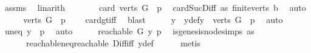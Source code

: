 \begin{isabellebody}
\ assms\ \isamarkupfalse%
\ linarith\isanewline
\ \ \isamarkupfalse%
\ \isamarkupfalse%
\ {\isachardoublequoteopen}{}\ {\isacharless}{\kern0pt}\ card\ {\isacharparenleft}{\kern0pt}{\isacharparenleft}{\kern0pt}verts\ G{\isacharparenright}{\kern0pt}\ {\isacharminus}{\kern0pt}\ {\isacharbraceleft}{\kern0pt}p{\isacharbraceright}{\kern0pt}{\isacharparenright}{\kern0pt}{\isachardoublequoteclose}\ \isamarkupfalse%
\ card{\isacharunderscore}{\kern0pt}Suc{\isacharunderscore}{\kern0pt}Diff{}\ as\ finite{\isacharunderscore}{\kern0pt}verts\ b{}\ \isamarkupfalse%
\ auto\isanewline
\ \ \isamarkupfalse%
\ \isamarkupfalse%
\ {\isachardoublequoteopen}{\isacharparenleft}{\kern0pt}{\isacharparenleft}{\kern0pt}verts\ G{\isacharparenright}{\kern0pt}\ {\isacharminus}{\kern0pt}\ {\isacharbraceleft}{\kern0pt}p{\isacharbraceright}{\kern0pt}{\isacharparenright}{\kern0pt}\ {\isasymnoteq}\ {\isacharbraceleft}{\kern0pt}{\isacharbraceright}{\kern0pt}{\isachardoublequoteclose}\ \isamarkupfalse%
\ card{\isacharunderscore}{\kern0pt}gt{\isacharunderscore}{\kern0pt}{}{\isacharunderscore}{\kern0pt}iff\ \isamarkupfalse%
\ blast\isanewline
\ \ \isamarkupfalse%
\ \isamarkupfalse%
\ y\ \ y{\isacharunderscore}{\kern0pt}def{\isacharcolon}{\kern0pt}{\isachardoublequoteopen}y\ {\isasymin}\ {\isacharparenleft}{\kern0pt}verts\ G{\isacharparenright}{\kern0pt}\ {\isacharminus}{\kern0pt}\ {\isacharbraceleft}{\kern0pt}p{\isacharbraceright}{\kern0pt}{\isachardoublequoteclose}\ \isamarkupfalse%
\ auto\isanewline
\ \ \isamarkupfalse%
\ \isamarkupfalse%
\ uneq{\isacharcolon}{\kern0pt}\ {\isachardoublequoteopen}y\ {\isasymnoteq}\ p{\isachardoublequoteclose}\ \isamarkupfalse%
\ auto\isanewline
\ \ \isamarkupfalse%
\ \isamarkupfalse%
\ {\isachardoublequoteopen}reachable{}\ G\ y\ p{\isachardoublequoteclose}\ \isamarkupfalse%
\ is{\isacharunderscore}{\kern0pt}genesis{\isacharunderscore}{\kern0pt}node{\isachardot}{\kern0pt}simps\ as\isanewline
\ \ \ \ \ \ reachable{\isacharunderscore}{\kern0pt}neq{\isacharunderscore}{\kern0pt}reachable{}\ Diff{\isacharunderscore}{\kern0pt}iff\ y{\isacharunderscore}{\kern0pt}def\isanewline
\ \ \ \ \isamarkupfalse%
\ metis\ \isanewline
\ \ \isamarkupfalse%
\ \isamarkupfalse%

\end{isabellebody}
